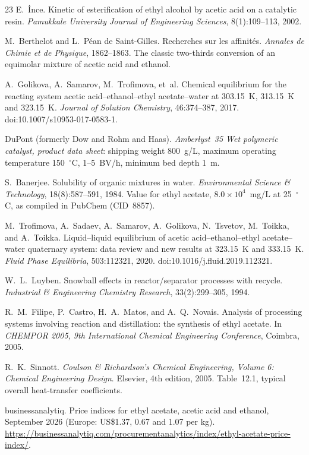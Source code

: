 \documentclass[10pt,a4paper]{article}
\begin{document}
\begin{thebibliography}{23}
 E.~\.{I}nce. Kinetic of esterification of ethyl alcohol by acetic acid on a catalytic resin. \textit{Pamukkale University Journal of Engineering Sciences}, 8(1):109--113, 2002.

 M.~Berthelot and L.~P\'ean de Saint-Gilles. Recherches sur les affinit\'es. \textit{Annales de Chimie et de Physique}, 1862--1863. The classic two-thirds conversion of an equimolar mixture of acetic acid and ethanol.

 A.~Golikova, A.~Samarov, M.~Trofimova, et~al. Chemical equilibrium for the reacting system acetic acid--ethanol--ethyl acetate--water at 303.15~K, 313.15~K and 323.15~K. \textit{Journal of Solution Chemistry}, 46:374--387, 2017. doi:10.1007/s10953-017-0583-1.

 DuPont (formerly Dow and Rohm and Haas). \textit{Amberlyst\texttrademark\ 35 Wet polymeric catalyst, product data sheet}: shipping weight 800~g/L, maximum operating temperature 150~$^\circ$C, 1--5~BV/h, minimum bed depth 1~m.

 S.~Banerjee. Solubility of organic mixtures in water. \textit{Environmental Science \& Technology}, 18(8):587--591, 1984. Value for ethyl acetate, $8.0 \times 10^4$~mg/L at 25~$^\circ$C, as compiled in PubChem (CID~8857).

 M.~Trofimova, A.~Sadaev, A.~Samarov, A.~Golikova, N.~Tsvetov, M.~Toikka, and A.~Toikka. Liquid--liquid equilibrium of acetic acid--ethanol--ethyl acetate--water quaternary system: data review and new results at 323.15~K and 333.15~K. \textit{Fluid Phase Equilibria}, 503:112321, 2020. doi:10.1016/j.fluid.2019.112321.

 W.~L.~Luyben. Snowball effects in reactor/separator processes with recycle. \textit{Industrial \& Engineering Chemistry Research}, 33(2):299--305, 1994.

 R.~M.~Filipe, P.~Castro, H.~A.~Matos, and A.~Q.~Novais. Analysis of processing systems involving reaction and distillation: the synthesis of ethyl acetate. In \textit{CHEMPOR 2005, 9th International Chemical Engineering Conference}, Coimbra, 2005.

 R.~K.~Sinnott. \textit{Coulson \& Richardson's Chemical Engineering, Volume 6: Chemical Engineering Design}. Elsevier, 4th edition, 2005. Table~12.1, typical overall heat-transfer coefficients.

 businessanalytiq. Price indices for ethyl acetate, acetic acid and ethanol, September 2026 (Europe: US\$1.37, 0.67 and 1.07 per kg). \url{https://businessanalytiq.com/procurementanalytics/index/ethyl-acetate-price-index/}.


\end{thebibliography}
\end{document}

